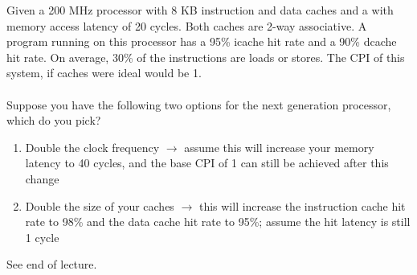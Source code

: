 \begin{problem}
  Given a 200 MHz processor with 8 KB instruction and data caches and a with memory access latency of 20 cycles. Both caches are 2-way associative. A program running on this processor has a 95\% icache hit rate and a 90\% dcache hit rate. On average, 30\% of the instructions are loads or stores. The CPI of this system, if caches were ideal would be 1. \\
  \\
  Suppose you have the following two options for the next generation processor, which do you pick?
  \begin{enumerate}
    \item Double the clock frequency \(\to\) assume this will increase your memory latency to 40 cycles, and the base CPI of 1 can still be achieved after this change
    \item Double the size of your caches \(\to\) this will increase the instruction cache hit rate to 98\% and the data cache hit rate to 95\%; assume the hit latency is still 1 cycle
  \end{enumerate}
\end{problem}
\begin{answer}
  See end of lecture.
\end{answer}
